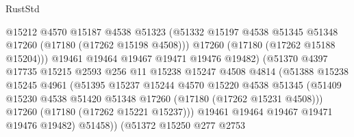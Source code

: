 \begin{lexlean}{RustStd}
\begin{coremodule}
{\begin{coremodule}
{{{{{{{{{{{{{{{{{{{{{{{{{{{{{{{{{{{{{{{{{{{{{{{{{{{{{{{                                  @15212
                                  @4570
                                  @15187
                                  @4538
                                  @51323
                                  (@51332
                                    @15197
                                    @4538
                                    @51345
                                    @51348
                                    @17260
                                    (@17180 (@17262 @15198 @4508)))
                                  @17260
                                  (@17180 (@17262 @15188 @15204)))
                                @19461
                                @19464
                                @19467
                                @19471
                                @19476
                                @19482)
                              (@51370
                                @4397
                                @17735
                                @15215
                                @2593
                                @256
                                @11
                                @15238
                                @15247
                                @4508
                                @4814
                                (@51388
                                  @15238
                                  @15245
                                  @4961
                                  (@51395
                                    @15237
                                    @15244
                                    @4570
                                    @15220
                                    @4538
                                    @51345
                                    (@51409
                                      @15230
                                      @4538
                                      @51420
                                      @51348
                                      @17260
                                      (@17180 (@17262 @15231 @4508)))
                                    @17260
                                    (@17180 (@17262 @15221 @15237)))
                                  @19461
                                  @19464
                                  @19467
                                  @19471
                                  @19476
                                  @19482)
                                @51458))
                            (@51372
                              @15250
                              @277
                              @2753
}}}}}}}}}}}}}}}}}}}}}}}}}}}}}}}}}}}}}}}}}}}}}}}}}}}}}}}
\end{coremodule}}
\end{coremodule}
\end{lexlean}
